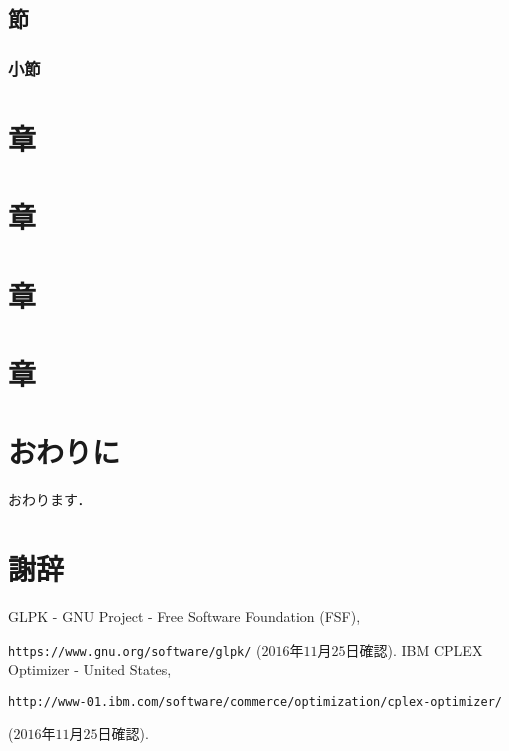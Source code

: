 \documentclass[a4paper,12pt,fleqn]{jarticle}
\begin{document}
\subsection{節}
\subsubsection{小節}

\newpage
\section{章}

\newpage
\section{章}

\newpage
\section{章}

\newpage
\section{章}

\newpage
\section{おわりに}
おわります．

\newpage
\section*{謝辞}

\newpage
\begin{thebibliography}{99}
GLPK - GNU Project - Free Software Foundation (FSF), \par \verb|https://www.gnu.org/software/glpk/| ($2016$年$11$月$25$日確認).
IBM CPLEX Optimizer - United States, \par \verb|http://www-01.ibm.com/software/commerce/optimization/cplex-optimizer/| \par ($2016$年$11$月$25$日確認).
\end{thebibliography}
\end{document}
